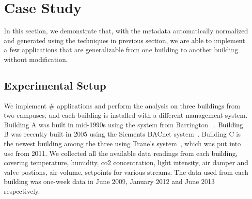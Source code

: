 \section{Case Study}
In this section, we demonstrate that, with the metadata automatically normalized and generated using the techniques in previous section, we are able to implement a few applications that are generalizable from one building to another building without modification.

\subsection{Experimental Setup}
We implement \# applications and perform the analysis on three buildings from two campuses, and each building is installed with a different management system. Building A was built in mid-1990s using the system from Barrington ~\cite{}. Building B was recently built in 2005 using the Siements BACnet system~\cite{}. Building C is the newest building among the three using Trane's system~\cite{}, which was put into use from 2011. We collected all the available data readings from each building, covering temperature, humidity, co2 concentration, light intensity, air damper and valve postions, air volume, setpoints for various streams. The data used from each building was one-week data in June 2009, January 2012 and June 2013 respectively.

